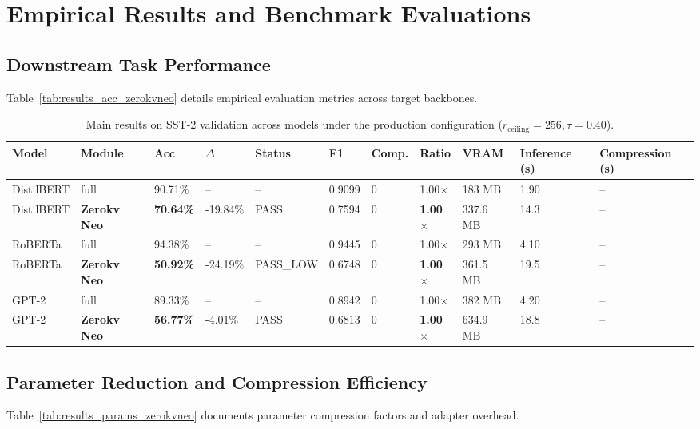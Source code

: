 \section{Empirical Results and Benchmark Evaluations}

\subsection{Downstream Task Performance}
Table~\ref{tab:results_acc_zerokvneo} details empirical evaluation metrics across target backbones.

\begin{table}[t]
\centering
\small
\begin{tabular}{lllllllllll}
\toprule
\textbf{Model} & \textbf{Module} & \textbf{Acc} & \textbf{$\Delta$} & \textbf{Status} & \textbf{F1} & \textbf{Comp.} & \textbf{Ratio} & \textbf{VRAM} & \textbf{Inference (s)} & \textbf{Compression (s)} \\
\midrule
DistilBERT & full & 90.71\% & -- & -- & 0.9099 & 0 & 1.00$\times$ & 183 MB & 1.90 & -- \\
DistilBERT & \textbf{Zerokv Neo} & \textbf{70.64\%} & -19.84\% & PASS & 0.7594 & 0 & \textbf{1.00$\times$} & 337.6 MB & 14.3 & -- \\
RoBERTa & full & 94.38\% & -- & -- & 0.9445 & 0 & 1.00$\times$ & 293 MB & 4.10 & -- \\
RoBERTa & \textbf{Zerokv Neo} & \textbf{50.92\%} & -24.19\% & PASS\_LOW & 0.6748 & 0 & \textbf{1.00$\times$} & 361.5 MB & 19.5 & -- \\
GPT-2 & full & 89.33\% & -- & -- & 0.8942 & 0 & 1.00$\times$ & 382 MB & 4.20 & -- \\
GPT-2 & \textbf{Zerokv Neo} & \textbf{56.77\%} & -4.01\% & PASS & 0.6813 & 0 & \textbf{1.00$\times$} & 634.9 MB & 18.8 & -- \\
\bottomrule
\end{tabular}
\caption{Main results on SST-2 validation across models under the production configuration ($r_{\mathrm{ceiling}}=256, \tau=0.40$).}
\label{tab:main_sst2}
\end{table}

\subsection{Parameter Reduction and Compression Efficiency}
Table~\ref{tab:results_params_zerokvneo} documents parameter compression factors and adapter overhead.

